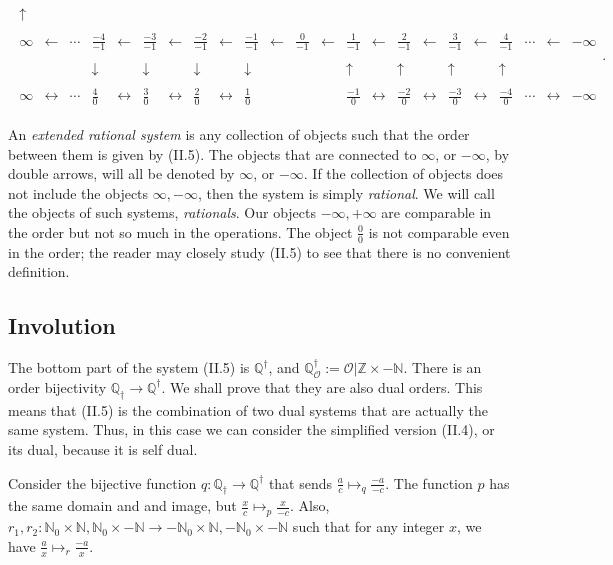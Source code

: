 \documentclass [12pt]{book}
\begin{document}
\begin{eqnarray}
\begin{array}{rrrrrrrrrrrrrrrrrrrrrrrrrrrrrrrrrrrrrrrrrrrrrrrrrrrrrrrrrrrrrrrrrrrrrrrrrrrrrrrr}
\uparrow&&&\\\\\infty&\leftarrow&\cdots & \frac{-4}{-1}&\leftarrow & \frac{-3}{-1}&\leftarrow  & \frac{-2}{-1}&\leftarrow  & \frac{-1}{-1}&\leftarrow  & \frac{0}{-1}&\leftarrow   & \frac{1}{-1} &\leftarrow & \frac{2}{-1}&\leftarrow  & \frac{3}{-1}&\leftarrow  & \frac{4}{-1} &\cdots&\leftarrow &-\infty\\\\&&&\downarrow&& \downarrow&&\downarrow&& \downarrow&&&&\uparrow &&\uparrow&&\uparrow&&
\uparrow&&&\\\\\infty&\leftrightarrow&\cdots & \frac{4}{0}&\leftrightarrow& \frac{3}{0}&\leftrightarrow& \frac{2}{0}&\leftrightarrow& \frac{1}{0}&&&& \frac{-1}{0} &\leftrightarrow& \frac{-2}{0}&\leftrightarrow& \frac{-3}{0}&\leftrightarrow& \frac{-4}{0} &\cdots&\leftrightarrow&-\infty\end{array}.\label{diagramRationals}\end{eqnarray}

An \textit{extended rational system} is any collection of objects such that the order between them is given by (II.5). The objects that are connected to $\infty$, or $-\infty$, by double arrows, will all be denoted by $\infty$, or $-\infty$. If the collection of objects does not include the objects $\infty,-\infty$, then the system is simply \textit{rational}. We will call the objects of such systems, \textit{rationals}. Our objects $-\infty,+\infty$ are comparable in the order but not so much in the operations. The object $\frac00$ is not comparable even in the order; the reader may closely study (II.5) to see that there is no convenient definition.

\subsection{Involution}

The bottom part of the system (II.5) is $\mathbb Q^\dagger$, and $\mathbb Q^\dagger_\mathcal O:=\mathcal O|\mathbb Z\times-\mathbb N$. There is an order bijectivity $\mathbb Q_\dagger\rightarrow\mathbb Q^\dagger$. We shall prove that they are also dual orders. This means that (II.5) is the combination of two dual systems that are actually the same system. Thus, in this case we can consider the simplified version (II.4), or its dual, because it is self dual. 

Consider the bijective function $q:\mathbb Q_\dagger\rightarrow\mathbb Q^\dagger$ that sends $\frac ac\mapsto_q\frac {-a}{-c}$. The function $p$ has the same domain and and image, but $\frac xc\mapsto_p\frac{x}{-c}$. Also, $r_1,r_2:\mathbb N_0\times\mathbb N,\mathbb N_0\times-\mathbb N\rightarrow-\mathbb N_0\times\mathbb N,-\mathbb N_0\times-\mathbb N$ such that for any integer $x$, we have $\frac ax\mapsto_r\frac{-a}x$.
\end{document}
